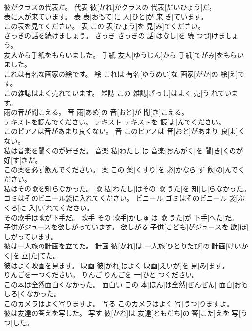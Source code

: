\documentclass[8pt]{extreport}
\begin{document}
\begin{CJK}{UTF8}{min}
\\	彼がクラスの代表だ。	代表	彼[かれ]がクラスの 代表[だいひょう]だ。	
\\	表に人が来ています。	表	表[おもて]に 人[ひと]が 来[き]ています。	
\\	この表を見てください。	表	この 表[ひょう]を 見[み]てください。	
\\	さっきの話を続けましょう。	さっき	さっきの 話[はなし]を 続[つづ]けましょう。	
\\	友人から手紙をもらいました。	手紙	友人[ゆうじん]から 手紙[てがみ]をもらいました。	
\\	これは有名な画家の絵です。	絵	これは 有名[ゆうめい]な 画家[がか]の 絵[え]です。	
\\	この雑誌はよく売れています。	雑誌	この 雑誌[ざっし]はよく 売[う]れています。	
\\	雨の音が聞こえる。	音	雨[あめ]の 音[おと]が 聞[き]こえる。	
\\	テキストを読んでください。	テキスト	テキストを 読[よ]んでください。	
\\	このピアノは音があまり良くない。	音	このピアノは 音[おと]があまり 良[よ]くない。	
\\	私は音楽を聞くのが好きだ。	音楽	私[わたし]は 音楽[おんがく]を 聞[き]くのが 好[す]きだ。	
\\	この薬を必ず飲んでください。	薬	この 薬[くすり]を 必[かなら]ず 飲[の]んでください。	
\\	私はその歌を知らなかった。	歌	私[わたし]はその 歌[うた]を 知[し]らなかった。	
\\	ゴミはそのビニール袋に入れてください。	ビニール	ゴミはそのビニール 袋[ぶくろ]に 入[い]れてください。	
\\	その歌手は歌が下手だ。	歌手	その 歌手[かしゅ]は 歌[うた]が 下手[へた]だ。	
\\	子供がジュースを欲しがっています。	欲しがる	子供[こども]がジュースを 欲[ほ]しがっています。	
\\	彼は一人旅の計画を立てた。	計画	彼[かれ]は 一人旅[ひとりたび]の 計画[けいかく]を 立[た]てた。	
\\	彼はよく映画を見ます。	映画	彼[かれ]はよく 映画[えいが]を 見[み]ます。	
\\	りんごを一つください。	りんご	りんごを 一[ひと]つください。	
\\	この本は全然面白くなかった。	面白い	この 本[ほん]は全然[ぜんぜん] 面白[おもしろ]くなかった。	
\\	このカメラはよく写りますよ。	写る	このカメラはよく 写[うつ]りますよ。	
\\	彼は友達の答えを写した。	写す	彼[かれ]は 友達[ともだち]の 答[こた]えを 写[うつ]した。	

\end{CJK}
\end{document}
